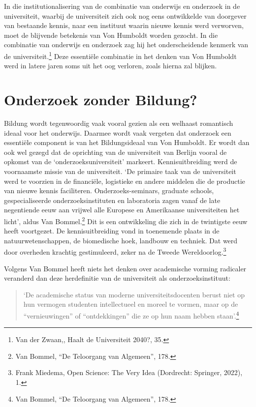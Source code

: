 \documentclass[empirical, authordate, ]{new-jote-article}
\begin{document}
	In die institutionalisering van de combinatie van onderwijs en onderzoek in de universiteit, waarbij de universiteit zich ook nog eens ontwikkelde van doorgever van bestaande kennis, naar een instituut waarin nieuwe kennis werd verworven, moet de blijvende betekenis van Von Humboldt worden gezocht. In die combinatie van onderwijs en onderzoek zag hij het onderscheidende kenmerk van de universiteit.\footnote{Van der Zwaan,, Haalt de Universiteit 2040?, 35.} Deze essentiële combinatie in het denken van Von Humboldt werd in latere jaren soms uit het oog verloren, zoals hierna zal blijken.



	\section{Onderzoek zonder Bildung?}



	Bildung wordt tegenwoordig vaak vooral gezien als een welhaast romantisch ideaal voor het onderwijs. Daarmee wordt vaak vergeten dat onderzoek een essentiële component is van het Bildungsideaal van Von Humboldt. Er wordt dan ook wel gezegd dat de oprichting van de universiteit van Berlijn vooral de opkomst van de ‘onderzoeksuniversiteit' markeert. Kennisuitbreiding werd de voornaamste missie van de universiteit. ‘De primaire taak van de universiteit werd te voorzien in de financiële, logistieke en andere middelen die de productie van nieuwe kennis faciliteren. Onderzoeks-seminars, graduate schools, gespecialiseerde onderzoeksinstituten en laboratoria zagen vanaf de late negentiende eeuw aan vrijwel alle Europese en Amerikaanse universiteiten het licht', aldus Van Bommel.\footnote{Van Bommel, “De Teloorgang van Algemeen”, 178.} Dit is een ontwikkeling die zich in de twintigste eeuw heeft voortgezet. De kennisuitbreiding vond in toenemende plaats in de natuurwetenschappen, de biomedische hoek, landbouw en techniek. Dat werd door overheden krachtig gestimuleerd, zeker na de Tweede Wereldoorlog.\footnote{Frank Miedema, Open Science: The Very Idea (Dordrecht: Springer, 2022), 1.}



	Volgens Van Bommel heeft niets het denken over academische vorming radicaler veranderd dan deze herdefinitie van de universiteit als onderzoeksinstituut:

	\begin{quote}
		\itshape

		‘De academische status van moderne universiteitsdocenten berust niet op hun vermogen studenten intellectueel en moreel te vormen, maar op de “vernieuwingen” of “ontdekkingen” die ze op hun naam hebben staan'.\footnote{Van Bommel, “De Teloorgang van Algemeen”, 178.}
	\end{quote}
\end{document}
